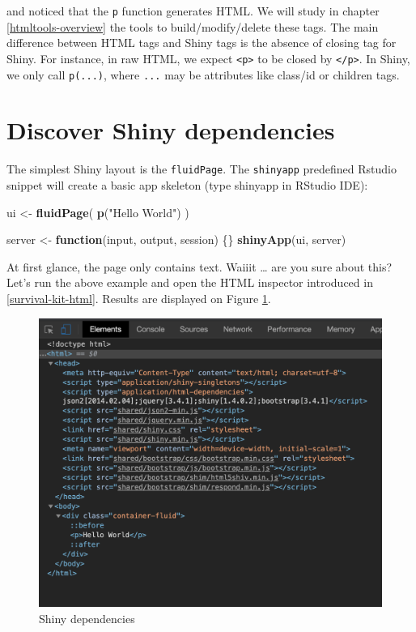\documentclass[]{book}
\newenvironment{Shaded}{\begin{snugshade}}{\end{snugshade}}
\newcommand{\ControlFlowTok}[1]{\textcolor[rgb]{0.13,0.29,0.53}{\textbf{#1}}}
\newcommand{\KeywordTok}[1]{\textcolor[rgb]{0.13,0.29,0.53}{\textbf{#1}}}
\newcommand{\NormalTok}[1]{#1}
\newcommand{\StringTok}[1]{\textcolor[rgb]{0.31,0.60,0.02}{#1}}
\begin{document}
and noticed that the \texttt{p} function generates HTML. We will study in chapter \ref{htmltools-overview} the tools to build/modify/delete these tags. The main difference between HTML tags and Shiny tags is the absence of closing tag for Shiny. For instance, in raw HTML, we expect \texttt{\textless{}p\textgreater{}} to be closed by \texttt{\textless{}/p\textgreater{}}. In Shiny, we only call \texttt{p(...)}, where \texttt{...} may be attributes like class/id or children tags.

\hypertarget{discover-shiny-dependencies}{%
\section{Discover Shiny dependencies}\label{discover-shiny-dependencies}}

The simplest Shiny layout is the \texttt{fluidPage}. The \texttt{shinyapp} predefined Rstudio snippet will create a basic app skeleton (type shinyapp in RStudio IDE):

\begin{Shaded}
\begin{Highlighting}[]
\NormalTok{ui <-}\StringTok{ }\KeywordTok{fluidPage}\NormalTok{(}
  \KeywordTok{p}\NormalTok{(}\StringTok{"Hello World"}\NormalTok{)}
\NormalTok{)}

\NormalTok{server <-}\StringTok{ }\ControlFlowTok{function}\NormalTok{(input, output, session) \{\}}
\KeywordTok{shinyApp}\NormalTok{(ui, server)}
\end{Highlighting}
\end{Shaded}

At first glance, the page only contains text. Waiiit \ldots{} are you sure about this? Let's run the above example and open the HTML inspector introduced in \ref{survival-kit-html}. Results are displayed on Figure \ref{fig:shiny-deps}.

\begin{figure}
\includegraphics[width=14.92in]{images/survival-kit/shiny-deps} \caption{Shiny dependencies}\label{fig:shiny-deps}
\end{figure}
\end{document}

